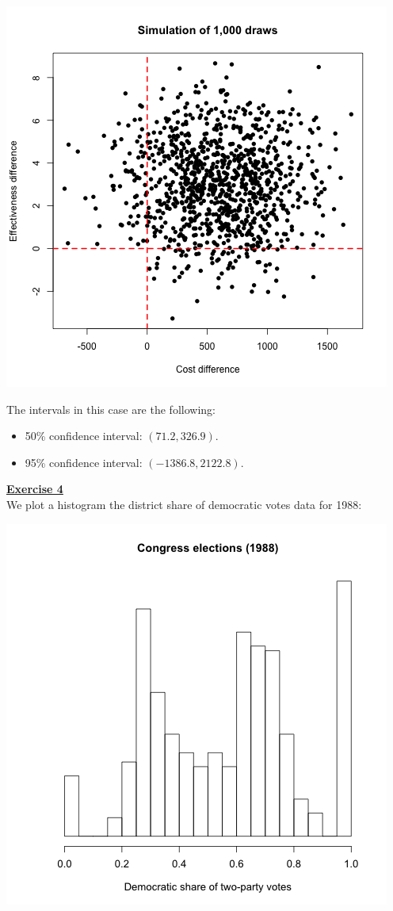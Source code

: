 \documentclass[a4paper, 11pt]{article}
\begin{document}
\begin{center}
\includegraphics[scale=0.6]{plot_ex3dot3.png}
\end{center}
The intervals in this case are the following:
\begin{itemize}
\item 50\% confidence interval: $(71.2, 326.9)$.
\item 95\% confidence interval: $(-1386.8, 2122.8)$.
\end{itemize}
\newpage
\textbf{\underline{Exercise 4}}\\
\newline We plot a histogram the district share of democratic votes data for 1988:
\begin{center}
\includegraphics[scale=0.5]{plot_ex4_1.png}
\end{center}
\end{document}

